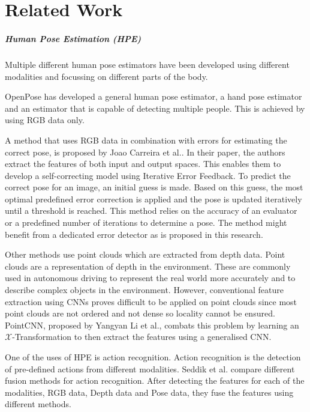 \chapter{Related Work}
\label{sec:related_work}

\paragraph{Human Pose Estimation (HPE)}

Multiple different human pose estimators have been developed using different modalities and focussing on different parts of the body. 

OpenPose has developed a general human pose estimator\cite{OpenPosePose}, a hand pose estimator\cite{OpenPoseHand} and an estimator that is capable of detecting multiple people\cite{OpenPoseMulti}. This is achieved by using RGB data only.

A method that uses RGB data in combination with errors for estimating the correct pose, is proposed by Joao Carreira et al.\cite{IterativeErrorFeedback}. In their paper, the authors extract the features of both input and output spaces. This enables them to develop a self-correcting model using Iterative Error Feedback. To predict the correct pose for an image, an initial guess is made. Based on this guess, the most optimal predefined error correction is applied and the pose is updated iteratively until a threshold is reached. This method relies on the accuracy of an evaluator or a predefined number of iterations to determine a pose. The method might benefit from a dedicated error detector as is proposed in this research. 

Other methods use point clouds which are extracted from depth data. Point clouds are a representation of depth in the environment. These are commonly used in autonomous driving to represent the real world more accurately and to describe complex objects in the environment. However, conventional feature extraction using CNNs proves difficult to be applied on point clouds since most point clouds are not ordered and not dense so locality cannot be ensured. PointCNN, proposed by Yangyan Li et al.\cite{li2018pointcnn}, combats this problem by learning an $\mathcal{X}$-Transformation to then extract the features using a generalised CNN.

One of the uses of HPE is action recognition. Action recognition is the detection of pre-defined actions from different modalities. Seddik et al. compare different fusion methods for action recognition\cite{Seddik2017}. After detecting the features for each of the modalities, RGB data, Depth data and Pose data, they fuse the features using different methods. 

